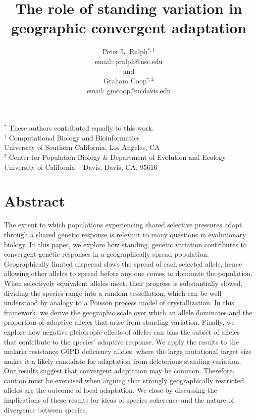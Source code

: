 \documentclass{article}
\title{The role of standing variation in geographic convergent adaptation}
\author{
Peter L. Ralph$^{*,1}$ \\ email: pralph@usc.edu  
\\and\\
Graham Coop$^{*,2}$ \\ email: gmcoop@ucdavis.edu 
}
\begin{document}
\maketitle
\date{}

\begin{center}

    $^*$ These authors contributed equally to this work. \\
$^1$ Computational Biology and Bioinformatics \\ 
University of Southern California, Los Angeles, CA \\
$^2$ Center for Population Biology \& Department of Evolution and Ecology \\ 
University of California -- Davis, Davis, CA, 95616\\
\end{center}



\section*{Abstract}

The extent to which populations experiencing shared selective pressures adapt through a shared genetic response is relevant to many questions in evolutionary biology. In this paper, we explore how standing, genetic variation contributes to convergent genetic responses in a geographically spread population. Geographically limited dispersal slows the spread of each selected allele, hence allowing other alleles to spread before any one comes to dominate the population. When selectively equivalent alleles meet, their progress is substantially slowed, dividing the species range into a random tessellation, which can be well understood by analogy to a Poisson process model of crystallization. In this framework, we derive the geographic scale over which an allele dominates and the proportion of adaptive alleles that arise from standing variation. Finally, we explore how negative pleiotropic effects of alleles can bias the subset of alleles that contribute to the species' adaptive response. We apply the results to the malaria resistance G6PD deficiency alleles, where the large mutational target size makes it a likely candidate for adaptation from deleterious standing variation. Our results suggest that convergent adaptation may be common. Therefore, caution must be exercised when arguing that strongly geographically restricted alleles are the outcome of local adaptation. We close by discussing the implications of these results for ideas of species coherence and the nature of divergence between species. 
\end{document}
